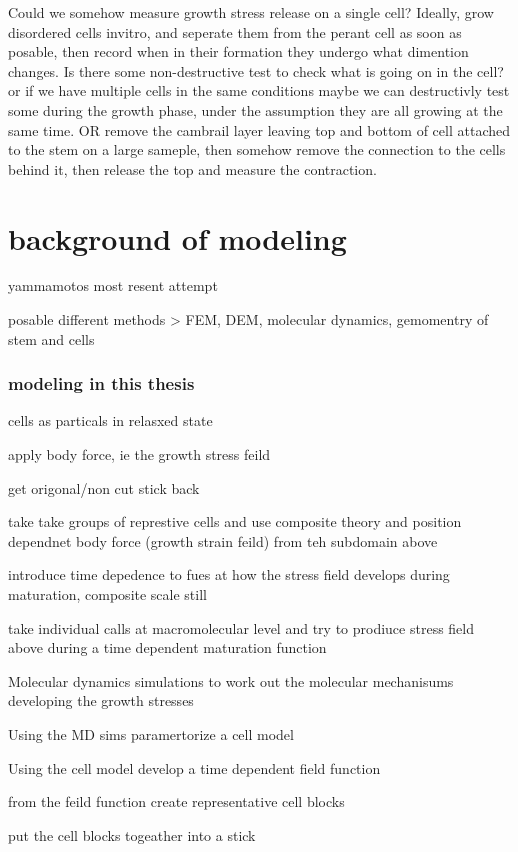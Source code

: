\documentclass{article}
\begin{document}
Could we somehow measure growth stress release on a single cell?
Ideally, grow disordered cells invitro, and seperate them from the perant cell as soon as posable, then record when in their formation they undergo what dimention changes. Is there some non-destructive test to check what is going on in the cell? or if we have multiple cells in the same conditions maybe we can destructivly test some during the growth phase, under the assumption they are all growing at the same time.
OR
remove the cambrail layer leaving top and bottom of cell attached to the stem on a large sameple, then somehow remove the connection to the cells behind it, then release the top and measure the contraction.


\section{background of modeling}

yammamotos most resent attempt

posable different methods > FEM, DEM, molecular dynamics, gemomentry of stem and cells

\subsubsection{modeling in this thesis}
cells as particals in relasxed state

apply body force, ie the growth stress feild

get origonal/non cut stick back

take take groups of represtive cells and use composite theory and position dependnet body force (growth strain feild) from teh subdomain above

introduce time depedence to fues at how the stress field develops during maturation, composite scale still

take individual calls at macromolecular level and try to prodiuce stress field above during a time dependent maturation function

Molecular dynamics simulations to work out the molecular mechanisums developing the growth stresses

Using the MD sims paramertorize a cell model

Using the cell model develop a time dependent field function

from the feild function create representative cell blocks

put the cell blocks togeather into a stick
\end{document}
